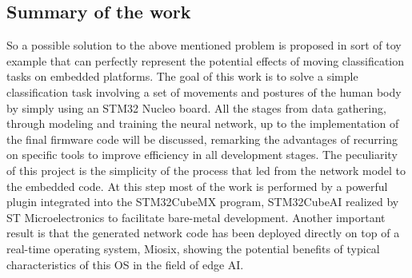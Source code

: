 \subsection{Summary of the work}
So a possible solution to the above mentioned problem is proposed in sort of toy example that can perfectly represent the potential effects of moving classification tasks on embedded platforms. The goal of this work is to solve a simple classification task involving a set of movements and postures of the human body by simply using an STM32 Nucleo board. All the stages from data gathering, through modeling and training the neural network, up to the implementation of the final firmware code will be discussed, remarking the advantages of recurring on specific tools to improve efficiency in all development stages. The peculiarity of this project is the simplicity of the process that led from the network model to the embedded code. At this step most of the work is performed by a powerful plugin integrated into the STM32CubeMX program, STM32CubeAI realized by ST Microelectronics to facilitate bare-metal development. Another important result is that the generated network code has been deployed directly on top of a real-time operating system, Miosix, showing the potential benefits of typical characteristics of this OS in the field of edge AI.   
\pagebreak

